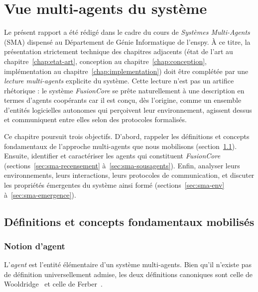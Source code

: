 \chapter{Vue multi-agents du système}
\label{chap:sma}


Le présent rapport a été rédigé dans le cadre du cours de \emph{Systèmes Multi-Agents} (SMA) dispensé au Département de Génie Informatique de l'\acrshort{enspy}. À ce titre, la présentation strictement technique des chapitres adjacents (état de l'art au chapitre~\ref{chap:etat-art}, conception au chapitre~\ref{chap:conception}, implémentation au chapitre~\ref{chap:implementation}) doit être complétée par une \emph{lecture multi-agents} explicite du système. Cette lecture n'est pas un artifice rhétorique : le système \emph{FusionCore} se prête naturellement à une description en termes d'agents coopérants car il est conçu, dès l'origine, comme un ensemble d'entités logicielles autonomes qui perçoivent leur environnement, agissent dessus et communiquent entre elles selon des protocoles formalisés.

Ce chapitre poursuit trois objectifs. D'abord, rappeler les définitions et concepts fondamentaux de l'approche multi-agents que nous mobilisons (section~\ref{sec:sma-defs}). Ensuite, identifier et caractériser les agents qui constituent \emph{FusionCore} (sections~\ref{sec:sma-recensement} à~\ref{sec:sma-sousagents}). Enfin, analyser leurs environnements, leurs interactions, leurs protocoles de communication, et discuter les propriétés émergentes du système ainsi formé (sections~\ref{sec:sma-env} à~\ref{sec:sma-emergence}).

\section{Définitions et concepts fondamentaux mobilisés}
\label{sec:sma-defs}

\subsection{Notion d'agent}

L'\emph{agent} est l'entité élémentaire d'un système multi-agents. Bien qu'il n'existe pas de définition universellement admise, les deux définitions canoniques sont celle de Wooldridge~\cite{wooldridge_2002_sma} et celle de Ferber~\cite{ferber_1995_sma}.

